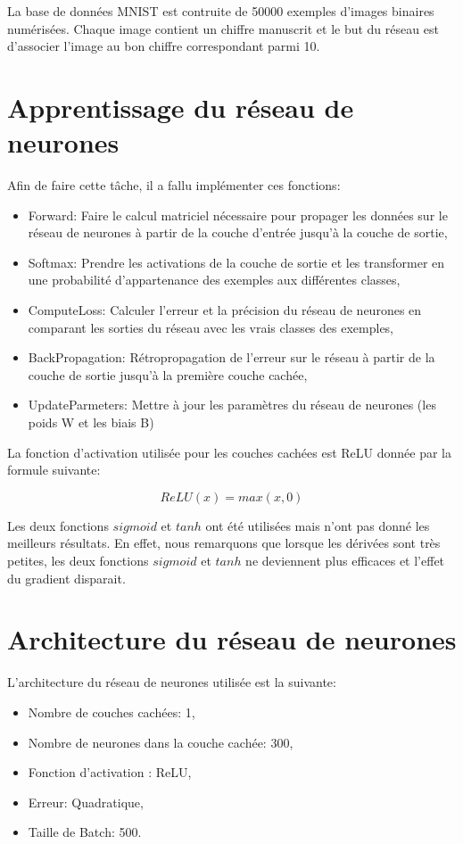 \documentclass[a4paper,english,12pt]{article}
\begin{document}
La base de données MNIST est contruite de 50000 exemples d'images binaires numérisées. Chaque image contient un chiffre manuscrit et le but du réseau est d'associer l'image au bon chiffre correspondant parmi 10. 

\section{Apprentissage du réseau de neurones}
Afin de faire cette tâche, il a fallu implémenter ces fonctions:
\begin{itemize}
	\item Forward: Faire le calcul matriciel nécessaire pour propager les données sur le réseau de neurones à partir de la couche d'entrée jusqu'à la couche de sortie,
	\item Softmax: Prendre les activations de la couche de sortie et les transformer en une probabilité d'appartenance des exemples aux différentes classes,
	\item ComputeLoss: Calculer l'erreur et la précision du réseau de neurones en comparant les sorties du réseau avec les vrais classes des exemples,
	\item BackPropagation: Rétropropagation de l'erreur sur le réseau à partir de la couche de sortie jusqu'à la première couche cachée,
	\item UpdateParmeters: Mettre à jour les paramètres du réseau de neurones (les poids W et les biais B)
\end{itemize}

La fonction d'activation utilisée pour les couches cachées est ReLU donnée par la formule suivante:

$$
ReLU(x)=max(x,0)
$$ 

Les deux fonctions $sigmoid$ et $tanh$ ont été utilisées mais n'ont pas donné les meilleurs résultats. En effet, nous remarquons que lorsque les dérivées sont très petites, les deux fonctions $sigmoid$ et $tanh$ ne deviennent plus efficaces et l'effet du gradient disparait. 

\section{Architecture du réseau de neurones}
L'architecture du réseau de neurones utilisée est la suivante: 
\begin{itemize}
	\item Nombre de couches cachées: 1,
	\item Nombre de neurones dans la couche cachée: 300,
	\item Fonction d'activation : ReLU,
	\item Erreur: Quadratique,
	\item Taille de Batch: 500.
\end{itemize}
\end{document}

